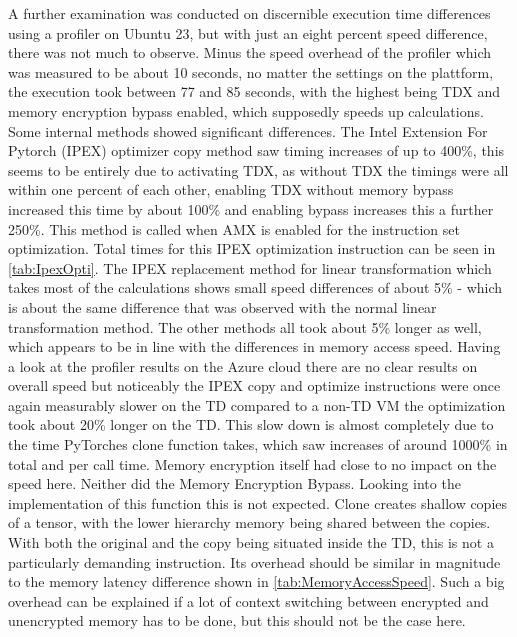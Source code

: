 A further examination was conducted on discernible execution time differences using a profiler on Ubuntu 23, but with just an eight percent speed difference, there was not much to observe. Minus the speed overhead of the profiler which was measured to be about 10 seconds, no matter the settings on the plattform, the execution took between 77 and 85 seconds, with the highest being TDX and memory encryption bypass enabled, which supposedly speeds up calculations. Some internal methods showed significant differences. The Intel Extension For Pytorch (IPEX) optimizer copy method saw timing increases of up to 400\%, this seems to be entirely due to activating TDX, as without TDX the timings were all within one percent of each other, enabling TDX without memory bypass increased this time by about 100\% and enabling bypass increases this a further 250\%. This method is called when AMX is enabled for the instruction set optimization. Total times for this IPEX optimization instruction can be seen in \ref{tab:IpexOpti}. The IPEX replacement method for linear transformation which takes most of the calculations shows small speed differences of about 5\% - which is about the same difference that was observed with the normal linear transformation method. The other methods all took about 5\% longer as well, which appears to be in line with the differences in memory access speed.
Having a look at the profiler results on the Azure cloud there are no clear results on overall speed but noticeably the IPEX copy and optimize instructions were once again measurably slower on the TD compared to a non-TD VM the optimization took about 20\% longer on the TD. This slow down is almost completely due to the time PyTorches clone function takes, which saw increases of around 1000\% in total and per call time. Memory encryption itself had close to no impact on the speed here. Neither did the Memory Encryption Bypass. Looking into the implementation of this function this is not expected. Clone creates shallow copies of a tensor, with the lower hierarchy memory being shared between the copies. With both the original and the copy being situated inside the TD, this is not a particularly demanding instruction. Its overhead should be similar in magnitude to the memory latency difference shown in \cref{tab:MemoryAccessSpeed}. Such a big overhead can be explained if a lot of context switching between encrypted and unencrypted memory has to be done, but this should not be the case here.
\begin{table}
\centering
{}
\caption{Comparison of different timings of IPEX optimization method}
\label{tab:IpexOpti}
\end{table}


